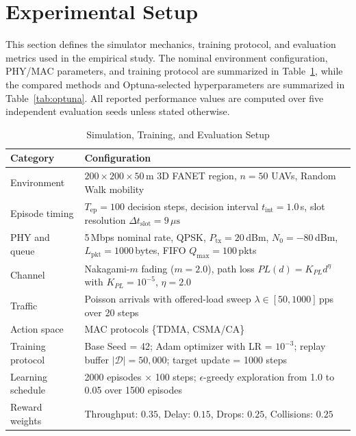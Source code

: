 
\section{Experimental Setup}
\label{sec:setup}

This section defines the simulator mechanics, training protocol, and evaluation metrics used in the empirical study. The nominal environment configuration, PHY/MAC parameters, and training protocol are summarized in Table~\ref{tab:setup}, while the compared methods and Optuna-selected hyperparameters are summarized in Table~\ref{tab:optuna}. All reported performance values are computed over five independent evaluation seeds unless stated otherwise.

\begin{table}[t]
    \centering
    \caption{Simulation, Training, and Evaluation Setup}
    \label{tab:setup}
    \begin{tabular}{@{}p{3.5cm} p{13.5cm}@{}}
        \toprule
        \textbf{Category} & \textbf{Configuration} \\
        \midrule
        Environment & $200 \times 200 \times 50$\,m 3D FANET region, $n = 50$ UAVs, Random Walk mobility \\
        Episode timing & $T_{\text{ep}} = 100$ decision steps, decision interval $t_{\text{int}} = 1.0$\,s, slot resolution $\Delta t_{\text{slot}} = 9\,\mu\text{s}$ \\
        PHY and queue & 5\,Mbps nominal rate, QPSK, $P_{\text{tx}} = 20$\,dBm, $N_0 = -80$\,dBm, $L_{\text{pkt}} = 1000$\,bytes, FIFO $Q_{\max} = 100$\,pkts \\
        Channel & Nakagami-$m$ fading ($m=2.0$), path loss $PL(d) = K_{PL}d^\eta$ with $K_{PL} = 10^{-5}$, $\eta = 2.0$ \\
        Traffic & Poisson arrivals with offered-load sweep $\lambda \in [50, 1000]$\,pps over 20 steps \\
        Action space & MAC protocols \{TDMA, CSMA/CA\} \\
        Training protocol & Base Seed = 42; Adam optimizer with LR = $10^{-3}$; replay buffer $|\mathcal{D}| = 50{,}000$; target update = 1000 steps \\
        Learning schedule & 2000 episodes $\times$ 100 steps; $\epsilon$-greedy exploration from 1.0 to 0.05 over 1500 episodes \\
        Reward weights & Throughput: $0.35$, Delay: $0.15$, Drops: $0.25$, Collisions: $0.25$ \\
        \bottomrule
    \end{tabular}
\end{table}

